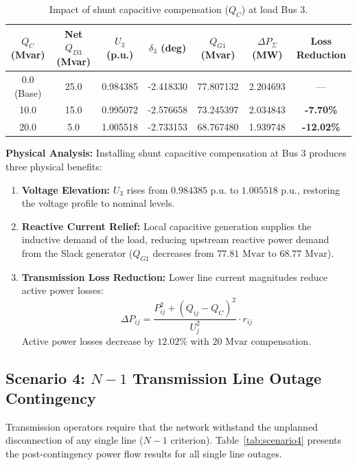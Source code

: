 \documentclass[12pt,a4paper,oneside]{report}
\begin{document}
\begin{table}[H]
\centering
\caption{Impact of shunt capacitive compensation ($Q_C$) at load Bus 3.}
\label{tab:scenario3}
\begin{tabular}{ccccccc}
\toprule
\textbf{$Q_C$ (Mvar)} & \textbf{Net $Q_{D3}$ (Mvar)} & \textbf{$U_3$ (p.u.)} & \textbf{$\delta_3$ (deg)} & \textbf{$Q_{G1}$ (Mvar)} & \textbf{$\Delta P_{\Sigma}$ (MW)} & \textbf{Loss Reduction} \\
\midrule
0.0 (Base) & 25.0 & 0.984385 & -2.418330 & 77.807132 & 2.204693 & --- \\
10.0 & 15.0 & 0.995072 & -2.576658 & 73.245397 & 2.034843 & \textbf{-7.70\%} \\
20.0 & 5.0 & 1.005518 & -2.733153 & 68.767480 & 1.939748 & \textbf{-12.02\%} \\
\bottomrule
\end{tabular}
\end{table}

\textbf{Physical Analysis:}
Installing shunt capacitive compensation at Bus 3 produces three physical benefits:
\begin{enumerate}
    \item \textbf{Voltage Elevation:} $U_3$ rises from $0.984385\text{ p.u.}$ to $1.005518\text{ p.u.}$, restoring the voltage profile to nominal levels.
    \item \textbf{Reactive Current Relief:} Local capacitive generation supplies the inductive demand of the load, reducing upstream reactive power demand from the Slack generator ($Q_{G1}$ decreases from $77.81\text{ Mvar}$ to $68.77\text{ Mvar}$).
    \item \textbf{Transmission Loss Reduction:} Lower line current magnitudes reduce active power losses:
    \begin{equation}
    \Delta P_{ij} = \frac{P_{ij}^2 + (Q_{ij} - Q_C)^2}{U_j^2} \cdot r_{ij}
    \end{equation}
    Active power losses decrease by $12.02\%$ with $20\text{ Mvar}$ compensation.
\end{enumerate}

\subsection{Scenario 4: $N-1$ Transmission Line Outage Contingency}
Transmission operators require that the network withstand the unplanned disconnection of any single line ($N-1$ criterion). Table~\ref{tab:scenario4} presents the post-contingency power flow results for all single line outages.
\end{document}
